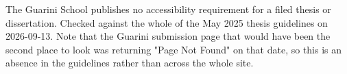 %

%
%
%

	{The Guarini School publishes no accessibility requirement for a filed
	 thesis or dissertation. Checked against the whole of the May 2025 thesis
	 guidelines on 2026-09-13. Note that the Guarini submission page that would
	 have been the second place to look was returning "Page Not Found" on that
	 date, so this is an absence in the guidelines rather than across the whole
	 site.}

%
\newcommand{\thesis@dc@dean}{[SET THE GUARINI DEAN, WITH DEGREE]}
\newcommand{\dartmouthdean}[1]{\renewcommand{\thesis@dc@dean}{#1}}

